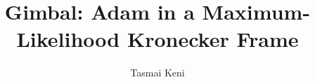 \documentclass[11pt]{article}
\title{Gimbal: Adam in a Maximum-Likelihood Kronecker Frame}
\author{Tasmai Keni}
\date{}
\theoremstyle{remark}
\begin{document}
\maketitle

\begin{abstract}

\end{abstract}
















\appendix

\end{document}
